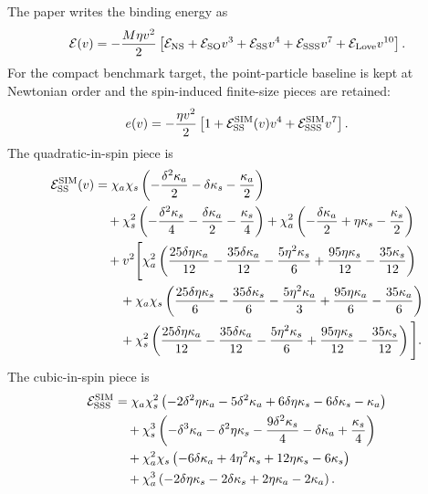 \documentclass[11pt]{article}
\begin{document}
The paper writes the binding energy as
\begin{equation}
  {\cal E}(v)
  =
  -\frac{M\eta v^2}{2}
  \left[
    {\cal E}_{\rm NS}
    +{\cal E}_{\rm SO}v^3
    +{\cal E}_{\rm SS}v^4
    +{\cal E}_{\rm SSS}v^7
    +{\cal E}_{\rm Love}v^{10}
  \right].
\end{equation}
For the compact benchmark target, the point-particle baseline is kept at
Newtonian order and the spin-induced finite-size pieces are retained:
\begin{equation}
  e(v)
  =
  -\frac{\eta v^2}{2}
  \left[
    1
    +{\cal E}_{\rm SS}^{\rm SIM}(v)v^4
    +{\cal E}_{\rm SSS}^{\rm SIM}v^7
  \right].
  \label{eq:energy-code}
\end{equation}
The quadratic-in-spin piece is
\begin{align}
{\cal E}_{\rm SS}^{\rm SIM}(v)
&=
\chi_a\chi_s
\left(
-\frac{\delta^2\kappa_a}{2}
-\delta\kappa_s
-\frac{\kappa_a}{2}
\right)
\nonumber\\
&\quad
+\chi_s^2
\left(
-\frac{\delta^2\kappa_s}{4}
-\frac{\delta\kappa_a}{2}
-\frac{\kappa_s}{4}
\right)
+\chi_a^2
\left(
-\frac{\delta\kappa_a}{2}
+\eta\kappa_s
-\frac{\kappa_s}{2}
\right)
\nonumber\\
&\quad
+v^2\Bigg[
\chi_a^2
\left(
\frac{25\delta\eta\kappa_a}{12}
-\frac{35\delta\kappa_a}{12}
-\frac{5\eta^2\kappa_s}{6}
+\frac{95\eta\kappa_s}{12}
-\frac{35\kappa_s}{12}
\right)
\nonumber\\
&\qquad
+\chi_a\chi_s
\left(
\frac{25\delta\eta\kappa_s}{6}
-\frac{35\delta\kappa_s}{6}
-\frac{5\eta^2\kappa_a}{3}
+\frac{95\eta\kappa_a}{6}
-\frac{35\kappa_a}{6}
\right)
\nonumber\\
&\qquad
+\chi_s^2
\left(
\frac{25\delta\eta\kappa_a}{12}
-\frac{35\delta\kappa_a}{12}
-\frac{5\eta^2\kappa_s}{6}
+\frac{95\eta\kappa_s}{12}
-\frac{35\kappa_s}{12}
\right)
\Bigg].
\end{align}
The cubic-in-spin piece is
\begin{align}
{\cal E}_{\rm SSS}^{\rm SIM}
&=
\chi_a\chi_s^2
\left(
-2\delta^2\eta\kappa_a
-5\delta^2\kappa_a
+6\delta\eta\kappa_s
-6\delta\kappa_s
-\kappa_a
\right)
\nonumber\\
&\quad
+\chi_s^3
\left(
-\delta^3\kappa_a
-\delta^2\eta\kappa_s
-\frac{9\delta^2\kappa_s}{4}
-\delta\kappa_a
+\frac{\kappa_s}{4}
\right)
\nonumber\\
&\quad
+\chi_a^2\chi_s
\left(
-6\delta\kappa_a
+4\eta^2\kappa_s
+12\eta\kappa_s
-6\kappa_s
\right)
\nonumber\\
&\quad
+\chi_a^3
\left(
-2\delta\eta\kappa_s
-2\delta\kappa_s
+2\eta\kappa_a
-2\kappa_a
\right).
\end{align}
\end{document}
